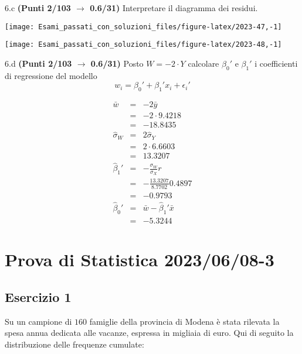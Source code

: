 \documentclass[
  11pt,
]{book}
\theoremstyle{mytheoremstyle}
\theoremstyle{mydefstyle}
\newenvironment{sol}
  {
  \begin{tcolorbox}[enhanced,breakable,arc=0.1mm,boxrule=1pt,colback=white,colframe=iblue,
  title=\bf \fontfamily{lmss}\selectfont \hspace{.5 cm} Soluzione,drop fuzzy shadow]

}{
\end{tcolorbox}
  }
\begin{document}
6.c \textbf{(Punti 2/103 \(\rightarrow\) 0.6/31)} Interpretare il diagramma dei residui.

\begin{center}\texttt{[image: Esami\_passati\_con\_soluzioni\_files/figure-latex/2023-47,-1]} \end{center}

\begin{sol}

\begin{center}\texttt{[image: Esami\_passati\_con\_soluzioni\_files/figure-latex/2023-48,-1]} \end{center}

\end{sol}

6.d \textbf{(Punti 2/103 \(\rightarrow\) 0.6/31)} Posto \(W=-2\cdot Y\) calcolare \(\beta_0'\) e \(\beta_1'\) i coefficienti di regressione del modello
\[
w_i = \beta_0'+\beta_1'x_i+\epsilon_i'
\]

\begin{sol}
\begin{eqnarray*}
  \bar w &=&  -2\bar y\\
  &=& -2\cdot9.4218\\
  &=& -18.8435\\
  \hat\sigma_W&=&2\hat\sigma_Y\\
  &=& 2\cdot6.6603\\
  &=& 13.3207\\
  \hat\beta_1' &=& -\frac{\sigma_W}{\sigma_X}r\\
  &=& -\frac{13.3207}{8.7702}0.4897\\
  &=& -0.9793\\
  \hat\beta_0'&=& \bar w - \hat\beta_1'\bar x\\
  &=& -5.3244
\end{eqnarray*}

\end{sol}

\section{Prova di Statistica 2023/06/08-3}\label{prova-di-statistica-20230608-3}

\subsection{Esercizio 1}\label{esercizio-1-28}

Su un campione di \(160\) famiglie della provincia di Modena è stata rilevata la spesa annua dedicata alle vacanze, espressa in migliaia di euro. Qui di seguito la distribuzione delle frequenze cumulate:
\end{document}
